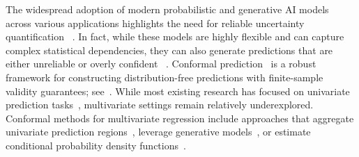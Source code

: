 
  The widespread adoption of modern probabilistic and generative AI models across various applications highlights the need for reliable uncertainty quantification ~\citep{gruber2023sourcesuncertaintymachinelearning}. In fact, while these models are highly flexible and can capture complex statistical dependencies, they can also generate predictions that are either unreliable or overly confident ~\citep{Nalisnick2018-ew}. Conformal prediction~\citep[CP;][]{vovk2005algorithmic,shafer2008tutorial} is a robust framework for constructing distribution-free predictions with finite-sample validity guarantees; see~\citep{angelopoulos2023conformal,Angelopoulos2024-dr}. While most existing research has focused on univariate prediction tasks~\citep{romano2019conformalized,sesia2021conformal,rossellini2024integrating}, multivariate settings remain relatively underexplored. Conformal methods for multivariate regression include approaches that aggregate univariate prediction regions~\citep{messoudi2021copula,Zhou2024-sq}, leverage generative models~\citep{wang2023probabilistic,plassier2024conditionally}, or estimate conditional probability density functions~\citep{izbicki2022cd}.



